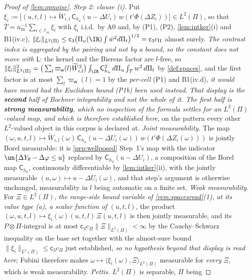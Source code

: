\begin{proof}[Proof of \cref{lem:opnoise}]
\emph{Step 2: clause (i).} Put
$\xi_i:=\big[(u,t,l)\mapsto\widetilde W_{i,l}\,\mathsf C_{h_u}(u-\Delta U_i)\,w(t'\Phi(\Delta Z_i))\big]\in L^{2}(\Pi)$, so that
$\bar T=n_{\mathrm m}^{-1}\sum_{i\in\mathcal I_m}\xi_i$ with $\xi_i$ i.i.d.\ by A0 and, by (P1), (P2),
\cref{lem:intker}(i) and B1(iv.c),
$\|\xi_i\|_{L^{2}(\Pi)}\le\mathsf c_3\big(\Pi_u(\IR)\int\bar w^{2}d\Pi_t\big)^{1/2}=\mathsf c_3c_\Pi$
almost surely. \emph{The contrast index is aggregated by the pairing and not by a bound, so the constant
does not move with $\mathsf L$}: the kernel and the Bierens factor are $l$-free, so
$\|\xi_i\|^{2}_{L^{2}(\Pi)}=\big(\sum_l\varpi_{\mathsf w}(l)\widetilde W_{i,l}^{2}\big)
\int_\IR\mathsf C_{h_u}^{2}\,d\Pi_u\int_{\mathcal T}w^{2}\,d\Pi_t$ by \cref{def:spaces}, and the first
factor is at most $\sum_l\varpi_{\mathsf w}(l)=1$ by the \emph{per-cell} (P1) and B1(iv.d), 
\emph{it would have moved had the Euclidean bound \textup{(P1b)} been used instead}.
\emph{That display is the \textbf{second} half of Bochner integrability and not the whole of it. The
first half is \textbf{strong measurability}, which no inspection of the formula settles for an
$L^{2}(\Pi)$-valued map, and which is therefore established here}, on the pattern every other
$L^{2}$-valued object in this corpus is declared at. \emph{Joint measurability.} The map
$(\omega,u,t,l)\mapsto\widetilde W_{i,l}(\omega)\,\mathsf C_{h_u}(u-\Delta U_i(\omega))\,w(t'\Phi(\Delta Z_i(\omega)))$
is jointly Borel measurable: it is \cref{prp:wellposed} Step~1's map with the indicator
$\un\{\Delta Y_\theta-\Delta\varphi\le u\}$ replaced by $\mathsf C_{h_u}(u-\Delta U_i)$, a
composition of the Borel map $\mathsf C_{h_u}$, continuously differentiable by \cref{lem:intker}(ii),
with the jointly measurable $(u,\omega)\mapsto u-\Delta U_i(\omega)$, and that step's argument is
otherwise unchanged, measurability in $l$
being automatic on a finite set. \emph{Weak measurability.} For $\Xi\in L^{2}(\Pi)$, \emph{the
range-side bound variable of \cref{rem:spacesread}\textup{(1)}, at its value type \textup{(a)}, a scalar
function of $(u,t,l)$}, the product
$(\omega,u,t,l)\mapsto\xi_i(\omega)(u,t,l)\,\Xi(u,t,l)$ is then jointly measurable, and its
$P\otimes\Pi$-integral is at most $\mathsf c_3c_\Pi\|\Xi\|_{L^{2}(\Pi)}<\infty$ by the
Cauchy--Schwarz inequality on the base set together with the almost-sure bound
$\|\xi_i\|_{L^{2}(\Pi)}\le\mathsf c_3c_\Pi$ just established, \emph{so no hypothesis beyond that
display is read here}; Fubini therefore makes
$\omega\mapsto\langle\xi_i(\omega),\Xi\rangle_{L^{2}(\Pi)}$ measurable for
\emph{every} $\Xi$, which is weak measurability. \emph{Pettis.} $L^{2}(\Pi)$ is separable, $\Pi$ being

\end{proof}
